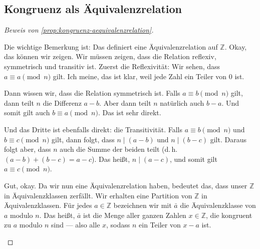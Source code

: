 \subsection{Kongruenz als Äquivalenzrelation}

\begin{math-stroke}
\end{math-stroke}

\begin{proof}[Beweis von \cref{prop:kongruenz-aequivalenzrelation}]
\begin{spoken-clean}[01:18:25 - 01:20:46]
Die wichtige Bemerkung ist: Das definiert eine Äquivalenzrelation auf $\mathbb{Z}$. Okay, das können wir zeigen. Wir müssen zeigen, dass die Relation reflexiv, symmetrisch und transitiv ist. Zuerst die Reflexivität: Wir sehen, dass $a \equiv a \pmod n$ gilt. Ich meine, das ist klar, weil jede Zahl ein Teiler von $0$ ist.

Dann wissen wir, dass die Relation symmetrisch ist. Falls $a \equiv b \pmod n$ gilt, dann teilt $n$ die Differenz $a - b$. Aber dann teilt $n$ natürlich auch $b - a$. Und somit gilt auch $b \equiv a \pmod n$. Das ist sehr direkt.

Und das Dritte ist ebenfalls direkt: die Transitivität. Falls $a \equiv b \pmod n$ und $b \equiv c \pmod n$ gilt, dann folgt, dass $n \mid (a - b)$ und $n \mid (b - c)$ gilt. Daraus folgt aber, dass $n$ auch die Summe der beiden teilt (d.\,h. $(a - b) + (b - c) = a - c$). Das heißt, $n \mid (a - c)$, und somit gilt $a \equiv c \pmod n$.

Gut, okay. Da wir nun eine Äquivalenzrelation haben, bedeutet das, dass unser $\mathbb{Z}$ in Äquivalenzklassen zerfällt. Wir erhalten eine Partition von $\mathbb{Z}$ in Äquivalenzklassen. Für jedes $a \in \mathbb{Z}$ bezeichnen wir mit $\bar{a}$ die Äquivalenzklasse von $a$ modulo $n$. Das heißt, $\bar{a}$ ist die Menge aller ganzen Zahlen $x \in \mathbb{Z}$, die kongruent zu $a$ modulo $n$ sind --- also alle $x$, sodass $n$ ein Teiler von $x - a$ ist.
\end{spoken-clean}


\end{proof}
